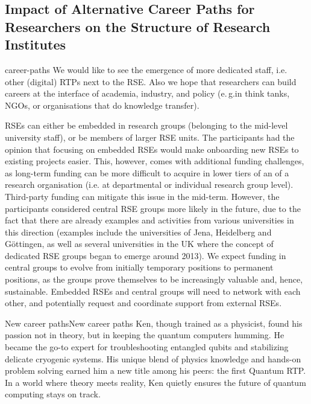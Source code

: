 \documentclass{eceasst}
\newcommand{\eg}{e.\,g.}
\begin{document}
\subsection{Impact of Alternative Career Paths for Researchers on the Structure of Research Institutes}
\begin{whatis}{}{career-paths}
We would like to see the emergence of more dedicated staff, i.e. other (digital) RTPs next to the RSE.
Also we hope that researchers can build careers at the interface of academia, industry, and policy (\eg in think tanks, NGOs,
or organisations that do knowledge transfer).
\end{whatis}
RSEs can either be embedded in research groups (belonging to the mid-level university staff),
or be members of larger RSE units.\cite{Kempf2025-draft}
The participants had the opinion that focusing on embedded RSEs would make onboarding new RSEs to existing projects easier.
This, however, comes with additional funding challenges,
as long-term funding can be more difficult to acquire in lower tiers of an of a research organisation (i.e. at departmental or individual research group level).
Third-party funding can mitigate this issue in the mid-term.
However, the participants considered central RSE groups more likely in the future,
due to the fact that there are already examples and activities from various universities in this direction
(examples include the universities of Jena, Heidelberg and Göttingen, as well as several universities in the UK where the concept of dedicated RSE groups began to emerge around 2013).
We expect funding in central groups to evolve from initially temporary positions to permanent positions,
as the groups prove themselves to be increasingly valuable and, hence, sustainable.
Embedded RSEs and central groups will need to network with each other,
and potentially request and coordinate support from external RSEs.

\begin{story}{New career paths}{New career paths}
Ken, though trained as a physicist, found his passion not in theory, but in keeping the quantum computers humming. He became the go-to expert for troubleshooting entangled qubits and stabilizing delicate cryogenic systems. His unique blend of physics knowledge and hands-on problem solving earned him a new title among his peers: the first Quantum RTP. In a world where theory meets reality, Ken quietly ensures the future of quantum computing stays on track.
\end{story}
\end{document}
